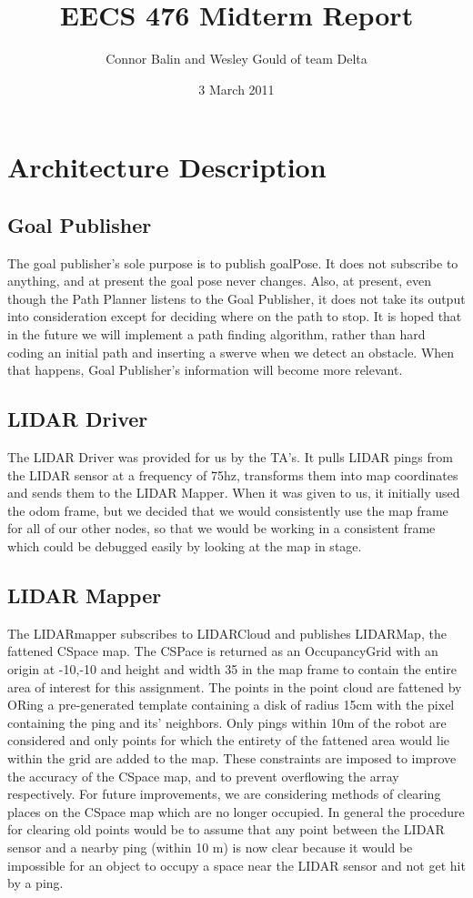 \documentclass{article}
\author{Connor Balin and Wesley Gould of team Delta}
\title{EECS 476 Midterm Report}
\date{3 March 2011}
\begin{document}
\maketitle

\section{Architecture Description}

\subsection{Goal Publisher}

The goal publisher's sole purpose is to publish goalPose.
It does not subscribe to anything, and at present the goal pose never changes.
Also, at present, even though the Path Planner listens to the Goal Publisher, it does not take its output into consideration except for deciding where on the path to stop.
It is hoped that in the future we will implement a path finding algorithm, rather than hard coding an initial path and inserting a swerve when we detect an obstacle.
When that happens, Goal Publisher's information will become more relevant.

\subsection{LIDAR Driver}

The LIDAR Driver was provided for us by the TA's.
It pulls LIDAR pings from the LIDAR sensor at a frequency of 75hz, transforms them into map coordinates and sends them to the LIDAR Mapper.
When it was given to us, it initially used the odom frame, but we decided that we would consistently use the map frame for all of our other nodes, so that we would be working in a consistent frame which could be debugged easily by looking at the map in stage.

\subsection{LIDAR Mapper}

The LIDARmapper subscribes to LIDARCloud and publishes LIDARMap, the fattened CSpace map.
The CSPace is returned as an OccupancyGrid with an origin at -10,-10 and height and width 35 in the map frame to contain the entire area of interest for this assignment.
The points in the point cloud are fattened by ORing a pre-generated template containing a disk of radius 15cm with the pixel containing the ping and its' neighbors.
Only pings within 10m of the robot are considered and only points for which the entirety of the fattened area would lie within the grid are added to the map.
These constraints are imposed to improve the accuracy of the CSpace map, and to prevent overflowing the array respectively.
For future improvements, we are considering methods of clearing places on the CSpace map which are no longer occupied.
In general the procedure for clearing old points would be to assume that any point between the LIDAR sensor and a nearby ping (within 10 m) is now clear because it would be impossible for an object to occupy a space near the LIDAR sensor and not get hit by a ping.
\end{document}
